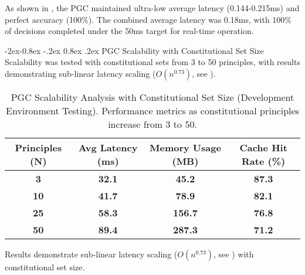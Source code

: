 \documentclass[manuscript,screen,9pt]{acmart}
\makeatletter
\renewcommand\subsubsection{\@startsection{subsubsection}{3}{\z@}%
  {-2ex\@plus -0.8ex \@minus -.2ex}%
  {0.8ex \@plus .2ex}%
  {\normalfont\normalsize\bfseries}}
\newcommand{\tablesize}{\footnotesize}
\newcommand{\tablenumfmt}[1]{\textbf{#1}}
\newcommand{\tableheader}[1]{\textbf{#1}}
\makeatother
\begin{document}
As shown in , the PGC maintained ultra-low average latency (0.144-0.215ms) and perfect accuracy (100\%). The combined average latency was 0.18ms, with 100\% of decisions completed under the 50ms target for real-time operation.

\subsubsection{PGC Scalability with Constitutional Set Size}
Scalability was tested with constitutional sets from 3 to 50 principles, with results demonstrating sub-linear latency scaling ($O(n^{0.73})$, see ).
\begin{table}[htbp]
\centering
\caption{PGC Scalability Analysis with Constitutional Set Size (Development Environment Testing). Performance metrics as constitutional principles increase from 3 to 50.}
\label{tab:pgc_scalability}
\tablesize
\begin{tabular}{@{}cccc@{}}
\toprule
\tableheader{Principles (N)} & \tableheader{Avg Latency (ms)} & \tableheader{Memory Usage (MB)} & \tableheader{Cache Hit Rate (\%)} \\
\midrule
\tablenumfmt{3}   & \tablenumfmt{32.1}  & \tablenumfmt{45.2}  & \tablenumfmt{87.3} \\
\tablenumfmt{10}  & \tablenumfmt{41.7}  & \tablenumfmt{78.9}  & \tablenumfmt{82.1} \\
\tablenumfmt{25}  & \tablenumfmt{58.3}  & \tablenumfmt{156.7} & \tablenumfmt{76.8} \\
\tablenumfmt{50}  & \tablenumfmt{89.4}  & \tablenumfmt{287.3} & \tablenumfmt{71.2} \\
\bottomrule
\end{tabular}
\end{table}
Results demonstrate sub-linear latency scaling ($O(n^{0.73})$, see ) with constitutional set size.
\end{document}
